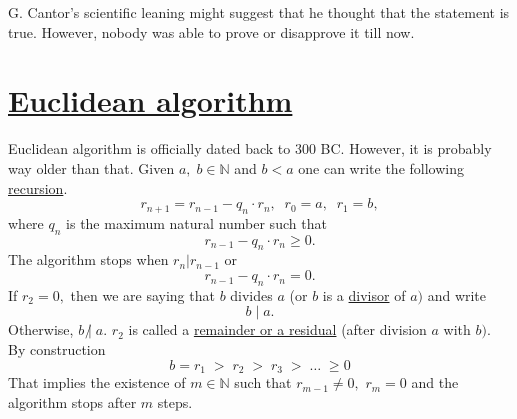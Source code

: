 \documentclass[color=black,11pt]{elegantpaper}
\begin{document}
G. Cantor's scientific leaning might suggest that he thought that the statement is true. However, nobody was able to prove or disapprove it till now.   

\section{\href{https://en.wikipedia.org/wiki/Euclidean_algorithm}{Euclidean algorithm}}
Euclidean algorithm is officially dated back to 300 BC. However, it is probably way older than that.  Given $a,\;b\in \mathbb{N}$ and $b < a$ one can write the following \href{https://en.wikipedia.org/wiki/Euclidean_algorithm}{recursion}.
\begin{equation}
\label{eq:euclide}
r_{n+1} = r_{n-1}-q_n \cdot r_n, \;\;r_0 =a,\;\;r_1 =b,
\end{equation}
where $q_n$ is the maximum natural number such that
$$
r_{n-1}-q_n \cdot r_n \ge 0.
$$
The algorithm stops when $r_n | r_{n-1}$ or
$$
r_{n-1}-q_n \cdot r_n = 0.
$$
If $r_2=0,$ then we are saying that $b$ divides $a$ (or $b$ is a \href{https://en.wikipedia.org/wiki/Divisor}{divisor}  of $a)$  and write
$$
 b\;|\; a.
$$
Otherwise, $b\; \not| \; a.$  $r_2$ is called a \href{https://en.wikipedia.org/wiki/Remainder}{remainder or a residual} (after division $a$ with $b).$\\

By construction
$$
b=r_1 \; > \; r_2\;>\;r_3\;>\;\dots \; \ge 0
$$
That implies the existence of $m\in \mathbb{N}$ such that $r_{m-1} \not= 0,$ $r_m=0$  and the algorithm stops after $m$ steps.
\end{document}
